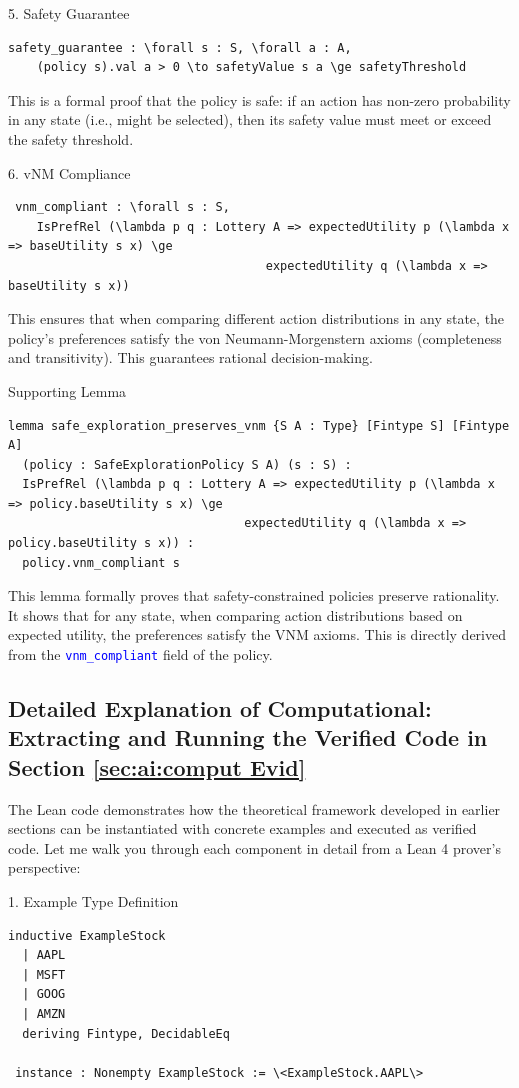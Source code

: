\documentclass{article}
\theoremstyle{definition}
\newcommand{\tactic}[1]{\textcolor{blue}{\texttt{#1}}}
\begin{document}
5. Safety Guarantee
\begin{lstlisting}
safety_guarantee : \forall s : S, \forall a : A,
    (policy s).val a > 0 \to safetyValue s a \ge safetyThreshold
\end{lstlisting}
This is a formal proof that the policy is safe: if an action has non-zero probability in any state (i.e., might be selected), then its safety value must meet or exceed the safety threshold.

6. vNM Compliance
\begin{lstlisting}
 vnm_compliant : \forall s : S,
    IsPrefRel (\lambda p q : Lottery A => expectedUtility p (\lambda x => baseUtility s x) \ge
                                    expectedUtility q (\lambda x => baseUtility s x))
\end{lstlisting}
This ensures that when comparing different action distributions in any state, the policy's preferences satisfy the von Neumann-Morgenstern axioms (completeness and transitivity). This guarantees rational decision-making.

Supporting Lemma
\begin{lstlisting}
lemma safe_exploration_preserves_vnm {S A : Type} [Fintype S] [Fintype A]
  (policy : SafeExplorationPolicy S A) (s : S) :
  IsPrefRel (\lambda p q : Lottery A => expectedUtility p (\lambda x => policy.baseUtility s x) \ge
                                 expectedUtility q (\lambda x => policy.baseUtility s x)) :
  policy.vnm_compliant s
\end{lstlisting}
This lemma formally proves that safety-constrained policies preserve rationality. It shows that for any state, when comparing action distributions based on expected utility, the preferences satisfy the VNM axioms. This is directly derived from the \tactic{vnm\_compliant} field of the policy.

\subsection{Detailed Explanation of Computational: Extracting and Running the Verified Code in Section \ref{sec:ai:comput Evid}}\label{explan:sec:ai:comput Evid}
The Lean code demonstrates how the theoretical framework developed in earlier sections can be instantiated with concrete examples and executed as verified code. Let me walk you through each component in detail from a Lean 4 prover's perspective:

1.  Example Type Definition
\begin{lstlisting}
inductive ExampleStock
  | AAPL
  | MSFT
  | GOOG
  | AMZN
  deriving Fintype, DecidableEq

 instance : Nonempty ExampleStock := \<ExampleStock.AAPL\>
\end{lstlisting}
\end{document}
